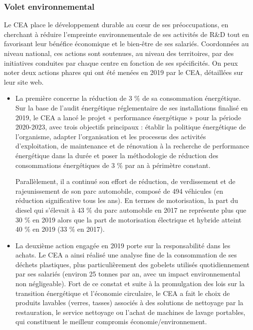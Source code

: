 \documentclass[12pt, oneside, a4paper, titlepage]{article}
\begin{document}
\subsubsection*{Volet environnemental}

Le CEA place le développement durable au cœur de ses préoccupations, en cherchant à réduire l’empreinte environnementale de ses activités de R\&D tout en favorisant leur bénéfice économique et le bien-être de ses salariés. Coordonnées au niveau national, ces actions sont soutenues, au niveau des territoires, par des initiatives conduites par chaque centre en fonction de ses spécificités.  On peux noter deux actions phares qui ont été menées en 2019 par le CEA, détaillées sur leur site web.
\begin{itemize}
    \item La première concerne la réduction de 3 \% de sa consommation énergétique. Sur la base de l’audit énergétique réglementaire de ses installations finalisé en 2019, le CEA a lancé le projet « performance énergétique » pour la période 2020-2023, avec trois objectifs principaux : établir la politique énergétique de l’organisme, adapter l’organisation et les processus des activités d’exploitation, de maintenance et de rénovation à la recherche de performance énergétique dans la durée et poser la méthodologie de réduction des consommations énergétiques de 3 \% par an à périmètre constant.

Parallèlement, il a continué son effort de réduction, de verdissement et de rajeunissement de son parc automobile, composé de 494 véhicules (en réduction significative tous les ans). En termes de motorisation, la part du diesel qui s’élevait à 43 \% du parc automobile en 2017 ne représente plus que 30 \% en 2019 alors que la part de motorisation électrique et hybride atteint 40 \% en 2019 (33 \% en 2017). 
    \item La deuxième action engagée en 2019 porte sur la responsabilité dans les achats. Le CEA a ainsi réalisé une analyse fine de la consommation de ses déchets plastiques, plus particulièrement des gobelets utilisés quotidiennement par ses salariés (environ 25 tonnes par an, avec un impact environnemental non négligeable). Fort de ce constat et suite à la promulgation des lois sur la transition énergétique et l’économie circulaire, le CEA a fait le choix de produits lavables (verres, tasses) associés à des solutions de nettoyage par la restauration, le service nettoyage ou l’achat de machines de lavage portables, qui constituent le meilleur compromis économie/environnement.
\end{itemize}
\end{document}
